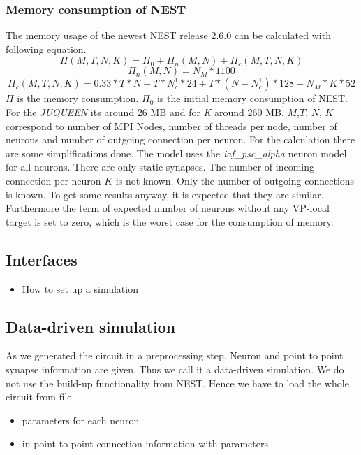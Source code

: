 \documentclass[a4paper]{article}
\begin{document}
\subsubsection{Memory consumption of NEST}
The memory usage of the newest NEST release 2.6.0 can be calculated with following equation. \cite{kunkel2014spiking}
\begin{equation}
  \Pi(M,T,N,K) =  \Pi_0 + \Pi_n(M,N)  + \Pi_c(M,T,N,K)
  \label{eq:NESTmemconsumption}
\end{equation} 
\begin{equation}
  \Pi_n(M,N) = N_M*1100
\end{equation}
\begin{equation}
  \Pi_c(M,T,N,K) = 0.33 * T * N + T * N^1_c * 24 + T*(N-N^1_c)*128 + N_M*K*52
\end{equation}
$\Pi$ is the memory consumption. $\Pi_0$ is the initial memory consumption of NEST.
For the \emph{JUQUEEN} its around 26 MB and for \emph{K} around 260 MB.
$M$,$T$, $N$, $K$ correspond to number of MPI Nodes, number of threads per node, number of neurons and number of outgoing connection per neuron.
For the calculation there are some simplifications done.
The model uses the \emph{iaf\_psc\_alpha} neuron model for all neurons. There are only static synapses.
The number of incoming connection per neuron $K$ is not known. Only the number of outgoing connections is known.
To get some results anyway, it is expected that they are similar.
Furthermore the term of expected number of neurons without any VP-local target is set to zero, which is the worst case for the consumption of memory.

\subsection{Interfaces}
\begin{itemize}
      \item How to set up a simulation
\end{itemize}

\subsection{Data-driven simulation}
As we generated the circuit in a preprocessing step. Neuron and point to point synapse information are given.
Thus we call it a data-driven simulation. We do not use the build-up functionality from NEST.
Hence we have to load the whole circuit from file.

\begin{itemize}
      \item parameters for each neuron
      \item in point to point connection information with parameters
   \end{itemize}
\end{document}
